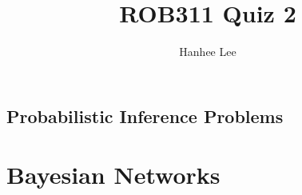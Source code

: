 \documentclass{article}
\title{ROB311 Quiz 2}
\author{Hanhee Lee}
\begin{document}
\maketitle

\tableofcontents
\newpage

\begin{center}
    \section*{Probabilistic Inference Problems}
\end{center}

\section{Bayesian Networks}

\newpage
\end{document}

